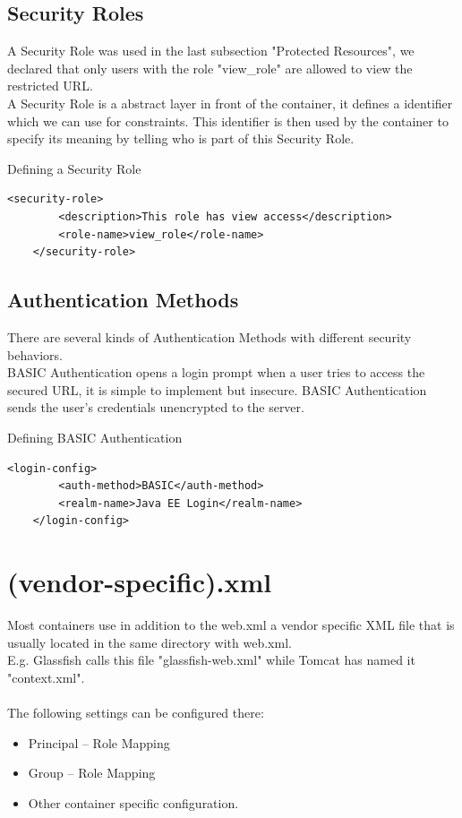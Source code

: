 \documentclass[12pt,a4paper]{report}
\begin{document}
\subsection*{Security Roles}
A Security Role was used in the last subsection "Protected Resources", we declared that only users with the role "view\_role" are allowed to view the restricted URL.\\
A Security Role is a abstract layer in front of the container, it defines a identifier which we can use for constraints. This identifier is then used by the container to specify its meaning by telling who is part of this Security Role.\\
\begin{bclogo}[couleur=yellow!15,arrondi=0.1,logo=\bccrayon, ombre = true]{Defining a Security Role}
\begin{lstlisting}[style=XML]
    <security-role>
	    <description>This role has view access</description>
	    <role-name>view_role</role-name>
    </security-role>
\end{lstlisting}
\end{bclogo}
\subsection*{Authentication Methods}
There are several kinds of Authentication Methods with different security behaviors.\\
BASIC Authentication opens a login prompt when a user tries to access the secured URL, it is simple to implement but insecure. BASIC Authentication sends the user's credentials unencrypted to the server.\\
\begin{bclogo}[couleur=yellow!15,arrondi=0.1,logo=\bccrayon, ombre = true]{Defining BASIC Authentication}
\begin{lstlisting}[style=XML]
    <login-config>
	    <auth-method>BASIC</auth-method>
	    <realm-name>Java EE Login</realm-name>
    </login-config>
\end{lstlisting}
\end{bclogo}

\section{(vendor-specific).xml}
Most containers use in addition to the web.xml a vendor specific XML file that is usually located in the same directory with web.xml.\\
E.g. Glassfish calls this file "glassfish-web.xml" while Tomcat has named it "context.xml".\\\\
The following settings can be configured there:\\
\begin{itemize}
	\item Principal – Role Mapping
	\item Group – Role Mapping
	\item Other container specific configuration.
\end{itemize}
\end{document}
